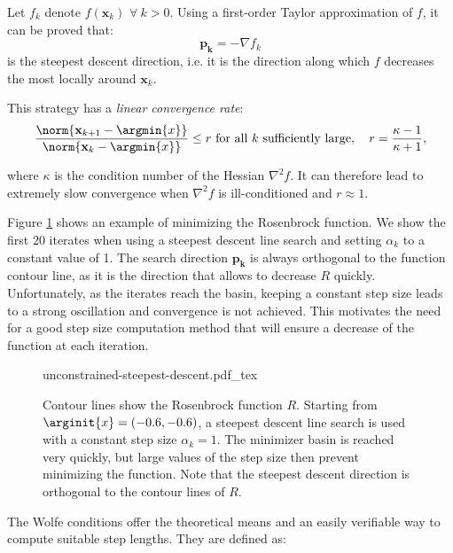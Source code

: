 Let $f_k$ denote $f(\mathbf{x}_k)$ $\forall~k > 0$. Using a
first-order Taylor approximation of $f$, it can be proved that:
\begin{equation}
\mathbf{p_k} = -\nabla f_k
\end{equation}
is the steepest descent direction, i.e. it is the direction along
which $f$ decreases the most locally around $\mathbf{x}_k$.

This strategy has a \emph{linear convergence rate}:
\begin{equation}
\frac{\norm{\mathbf{x}_{k+1}-\argmin{x}}}{\norm{\mathbf{x}_k-\argmin{x}}}
\le r \text{ for all } k \text{ sufficiently large}, \quad
r=\frac{\kappa-1}{\kappa+1},
\end{equation}

where $\kappa$ is the condition number of the Hessian $\nabla^2 f$.
It can therefore lead to extremely slow convergence when $\nabla^2 f$
is ill-conditioned and $r \approx 1$.

Figure \ref{fig:chap3-unconstrained-steepest-descent} shows an example
of minimizing the Rosenbrock function. We show the first 20 iterates
when using a steepest descent line search and setting $\alpha_k$ to a
constant value of 1. The search direction $\mathbf{p_k}$ is always
orthogonal to the function contour line, as it is the direction that
allows to decrease $R$ quickly. Unfortunately, as the iterates reach
the basin, keeping a constant step size leads to a strong oscillation
and convergence is not achieved. This motivates the need for a good
step size computation method that will ensure a decrease of the
function at each iteration.

\begin{figure}
  \centering
      {\def\svgwidth{0.8\linewidth}
        {\footnotesize
          
                     {unconstrained-steepest-descent.pdf_tex}
        }
      }
      \caption{Contour lines show the Rosenbrock function
        $R$. Starting from $\arginit{x}=(-0.6,-0.6)$, a steepest
        descent line search is used with a constant step size
        $\alpha_k=1$. The minimizer basin is reached very quickly,
        but large values of the step size then prevent minimizing the
        function. Note that the steepest descent direction is
        orthogonal to the contour lines of $R$.}
      \label{fig:chap3-unconstrained-steepest-descent}
\end{figure}

The Wolfe conditions offer the theoretical means and an easily
verifiable way to compute suitable step lengths. They are defined as:


